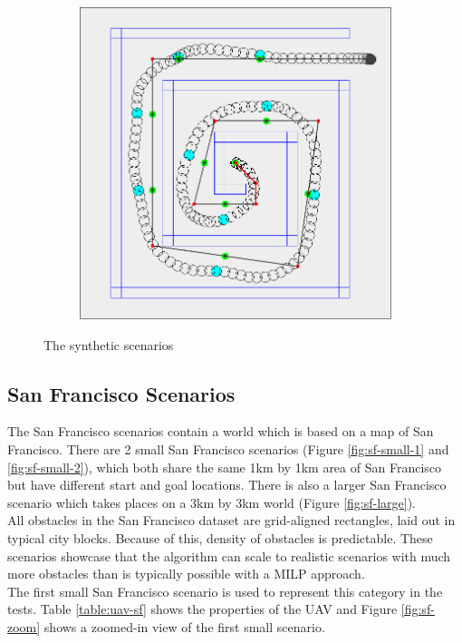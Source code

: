 \begin{figure}
	\begin{subfigure}[t]{0.5\textwidth}
        		\includegraphics[width=\textwidth]{img/spiral}
        		\caption{}
        		\label{fig:spiral}
	\end{subfigure}
        
    \caption{The synthetic scenarios}\label{fig:synth-scens}
\end{figure}
\clearpage
\subsection{San Francisco Scenarios}
\label{subsec:sf}
The San Francisco scenarios contain a world which is based on a map of San Francisco. There are 2 small San Francisco scenarios (Figure \ref{fig:sf-small-1} and \ref{fig:sf-small-2}), which both share the same 1km by 1km area of San Francisco but have different start and goal locations. There is also a larger San Francisco scenario which takes places on a 3km by 3km world (Figure \ref{fig:sf-large}). \\
All obstacles in the San Francisco dataset are grid-aligned rectangles, laid out in typical city blocks. Because of this, density of obstacles is predictable. These scenarios showcase that the algorithm can scale to realistic scenarios with much more obstacles than is typically possible with a MILP approach. \\
The first small San Francisco scenario is used to represent this category in the tests. Table \ref{table:uav-sf} shows the properties of the UAV and Figure \ref{fig:sf-zoom} shows a zoomed-in view of the first small scenario. 


